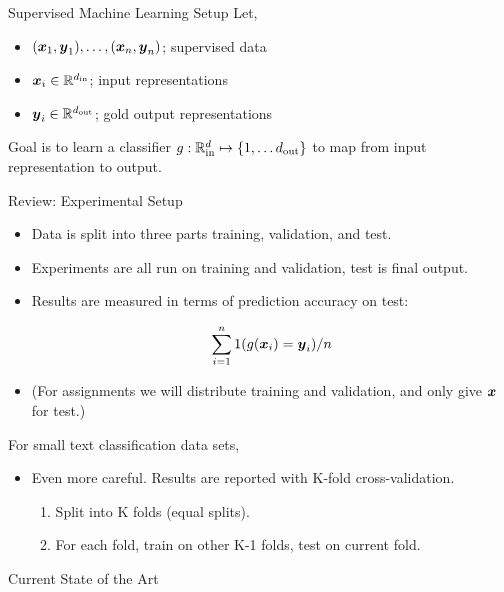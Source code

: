 \documentclass{beamer}
\begin{document}
\begin{frame}{Supervised Machine Learning Setup}
  Let, 
  \begin{itemize}
  \item $(\boldsymbol{x}_1, \boldsymbol{y}_1), \ldots, (\boldsymbol{x}_n, \boldsymbol{y}_n)$; supervised data
  \item $\boldsymbol{x}_i \in \mathbb{R}^{d_{\mathrm{in}}}$;  input representations  
  \item $\boldsymbol{y}_i \in \mathbb{R}^{d_{\mathrm{out}}}$; gold output representations 
  \end{itemize}

  Goal is to learn a classifier $g: \mathbb{R}^d_{\mathrm{in}} \mapsto \{1,\ldots d_{\mathrm{out}}\}$ to map from input representation to output.  
\end{frame}


\begin{frame}{Review: Experimental Setup}
  
  \begin{itemize}
  \item Data is split into three parts training, validation, and test.
  \item Experiments are all run on training and validation, test is final output.
  \item Results are measured in terms of prediction accuracy on test:

    \[ \sum_{i=1}^n 1(g(\boldsymbol{x}_i) = \boldsymbol{y}_i)  / n \] 

  \item (For assignments we will distribute training and validation, and only give $\boldsymbol{x}$ for test.)
  \end{itemize}
  
  For small text classification data sets,
  \begin{itemize}
  \item Even more careful. Results are reported with K-fold cross-validation. 
    \begin{enumerate}
    \item Split into K folds (equal splits).
    \item For each fold, train on other K-1 folds, test on current fold. 
    \end{enumerate}
  \end{itemize}
\end{frame}


\begin{frame}{Current State of the Art} 
  
\end{frame}
\end{document}
